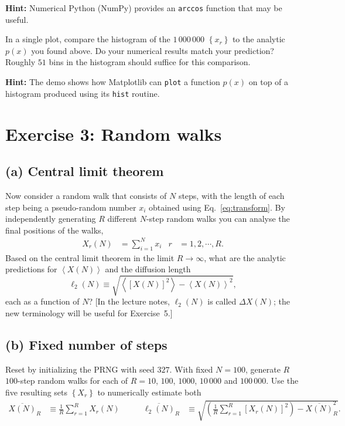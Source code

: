 \documentclass[12 pt]{article} %
\newcommand{\vev}[1]{\ensuremath{\left\langle #1 \right\rangle} }
\newcommand{\eq}[1]{Eq.~\ref{#1}}
\newcommand{\showmarks}[1]{\rightline{\texttt{[#1 marks]}}} %
\begin{document}
\textbf{Hint:} Numerical Python (NumPy) provides an \texttt{arccos} function that may be useful.

\showmarks{5}

In a single plot, compare the histogram of the $1\,000\,000$ $\left\{x_r\right\}$ to the analytic $p(x)$ you found above.
Do your numerical results match your prediction?
Roughly $51$ bins in the histogram should suffice for this comparison.

\textbf{Hint:} The demo shows how Matplotlib can \texttt{plot} a function $p(x)$ on top of a histogram produced using its \texttt{hist} routine.

\showmarks{4}



\newpage %
\section*{Exercise 3: Random walks}
\subsection*{(a) Central limit theorem}
Now consider a random walk that consists of $N$ steps, with the length of each step being a pseudo-random number $x_i$ obtained using \eq{eq:transform}.
By independently generating $R$ different $N$-step random walks you can analyse the final positions of the walks,
\begin{align*}
  X_r(N) & = \sum_{i = 1}^N x_i &
  r & = 1, 2, \cdots, R.
\end{align*}
Based on the central limit theorem in the limit $R \to \infty$, what are the analytic predictions for $\vev{X(N)}$ and the diffusion length
\begin{equation*}
  \ell_2(N) \equiv \sqrt{\vev{\left[X(N)\right]^2} - \vev{X(N)}^2},
\end{equation*}
each as a function of $N$?
[In the lecture notes, $\ell_2(N)$ is called $\Delta X(N)$; the new terminology will be useful for Exercise~5.]

\showmarks{2}

\subsection*{(b) Fixed number of steps}
Reset by initializing the PRNG with seed $327$.
With fixed $N = 100$, generate $R$ $100$-step random walks for each of $R = 10$, $100$, $1000$, $10\,000$ and $100\,000$.
Use the five resulting sets $\left\{X_r\right\}$ to numerically estimate both
\begin{align*}
  \overline{X(N)}_R & \equiv \frac{1}{R} \sum_{r = 1}^R X_r(N) \qquad &
  \overline{\ell_2(N)}_R & \equiv \sqrt{\left(\frac{1}{R} \sum_{r = 1}^R \left[X_r(N)\right]^2\right) - \overline{X(N)}_R^2}.
\end{align*}
\end{document}
